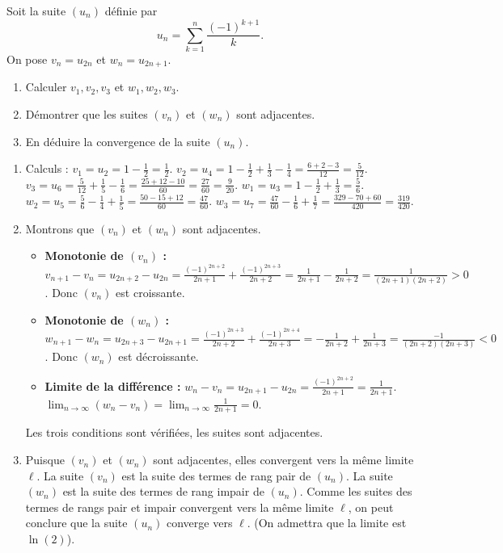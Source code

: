 \documentclass[solutions]{exercices}
\begin{document}
\begin{exercice}[\di]
	Soit la suite $(u_n)$ définie par
	\[
		u_n=\sum_{k=1}^{n}\frac{(-1)^{k+1}}{k}.
	\]
	On pose $v_n=u_{2n}$ et $w_n=u_{2n+1}$.
	\begin{enumerate}
		\item Calculer $v_1,v_2,v_3$ et $w_1,w_2,w_3$.
		\item Démontrer que les suites $(v_n)$ et $(w_n)$ sont adjacentes.
		\item En déduire la convergence de la suite $(u_n)$.
	\end{enumerate}
\end{exercice}

\begin{solution}
	\begin{enumerate}
		\item Calculs :
		      $v_1 = u_2 = 1 - \frac{1}{2} = \frac{1}{2}$.
		      $v_2 = u_4 = 1 - \frac{1}{2} + \frac{1}{3} - \frac{1}{4} = \frac{6+2-3}{12} = \frac{5}{12}$.
		      $v_3 = u_6 = \frac{5}{12} + \frac{1}{5} - \frac{1}{6} = \frac{25+12-10}{60} = \frac{27}{60} = \frac{9}{20}$.
		      $w_1 = u_3 = 1 - \frac{1}{2} + \frac{1}{3} = \frac{5}{6}$.
		      $w_2 = u_5 = \frac{5}{6} - \frac{1}{4} + \frac{1}{5} = \frac{50-15+12}{60} = \frac{47}{60}$.
		      $w_3 = u_7 = \frac{47}{60} - \frac{1}{6} + \frac{1}{7} = \frac{329-70+60}{420} = \frac{319}{420}$.
		\item Montrons que $(v_n)$ et $(w_n)$ sont adjacentes.
		      \begin{itemize}
			      \item \textbf{Monotonie de $(v_n)$ :} $v_{n+1}-v_n = u_{2n+2}-u_{2n} = \frac{(-1)^{2n+2}}{2n+1} + \frac{(-1)^{2n+3}}{2n+2} = \frac{1}{2n+1} - \frac{1}{2n+2} = \frac{1}{(2n+1)(2n+2)} > 0$. Donc $(v_n)$ est croissante.
			      \item \textbf{Monotonie de $(w_n)$ :} $w_{n+1}-w_n = u_{2n+3}-u_{2n+1} = \frac{(-1)^{2n+3}}{2n+2} + \frac{(-1)^{2n+4}}{2n+3} = -\frac{1}{2n+2} + \frac{1}{2n+3} = \frac{-1}{(2n+2)(2n+3)} < 0$. Donc $(w_n)$ est décroissante.
			      \item \textbf{Limite de la différence :} $w_n - v_n = u_{2n+1}-u_{2n} = \frac{(-1)^{2n+2}}{2n+1} = \frac{1}{2n+1}$.
			            $\lim_{n\to\infty} (w_n - v_n) = \lim_{n\to\infty} \frac{1}{2n+1} = 0$.
		      \end{itemize}
		      Les trois conditions sont vérifiées, les suites sont adjacentes.
		\item Puisque $(v_n)$ et $(w_n)$ sont adjacentes, elles convergent vers la même limite $\ell$.
		      La suite $(v_n)$ est la suite des termes de rang pair de $(u_n)$. La suite $(w_n)$ est la suite des termes de rang impair de $(u_n)$.
		      Comme les suites des termes de rangs pair et impair convergent vers la même limite $\ell$, on peut conclure que la suite $(u_n)$ converge vers $\ell$. (On admettra que la limite est $\ln(2)$).
	\end{enumerate}
\end{solution}
\end{document}
